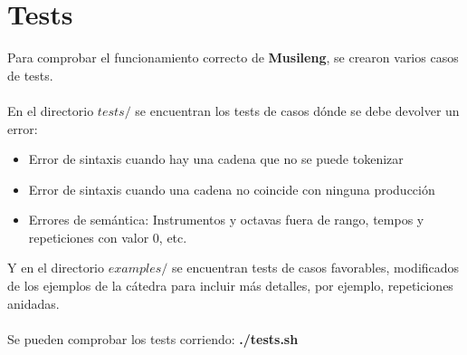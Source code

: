 \section{Tests}

Para comprobar el funcionamiento correcto de \textbf{Musileng}, se crearon varios casos de tests.\\
\\
En el directorio $tests/$ se encuentran los tests de casos dónde se debe devolver un error:\\
\begin{itemize}
\item Error de sintaxis cuando hay una cadena que no se puede tokenizar
\item Error de sintaxis cuando una cadena no coincide con ninguna producción
\item Errores de semántica: Instrumentos y octavas fuera de rango, tempos y repeticiones con valor 0, etc.
\end{itemize}

Y en el directorio $examples/$ se encuentran tests de casos favorables, modificados de los ejemplos de la cátedra para incluir más detalles, por ejemplo, repeticiones anidadas.\\
\\
Se pueden comprobar los tests corriendo:
\indent \textbf{./tests.sh}

\clearpage
